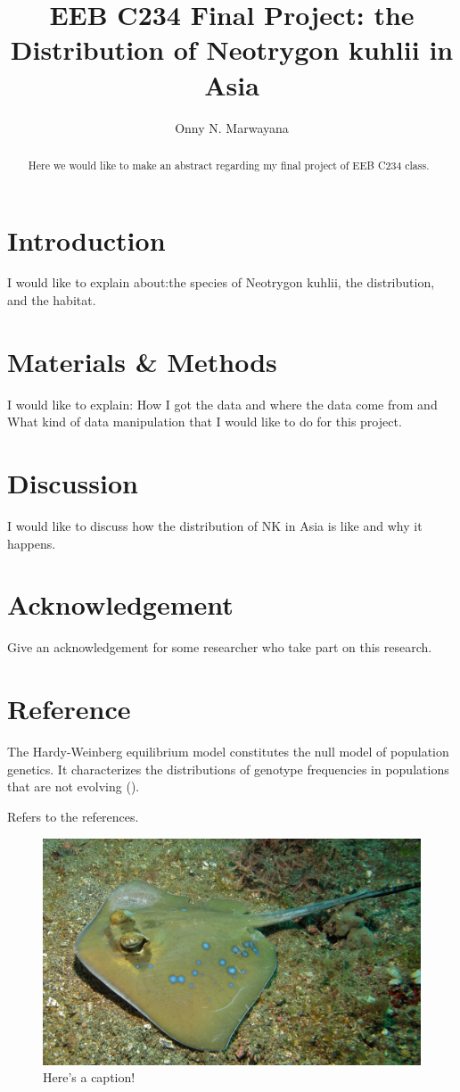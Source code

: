 \documentclass[12pt]{article}
\title{EEB C234 Final Project: the Distribution of Neotrygon kuhlii in Asia}
\author{Onny N. Marwayana}
\date{}
\begin{document}
\maketitle
\begin{abstract}
Here we would like to make an abstract regarding my final project of EEB C234 class.
\end{abstract}
\section{Introduction}
I would like to explain about:the species of Neotrygon kuhlii, the distribution, and the habitat.
\section{Materials \& Methods}
I would like to explain: How I got the data and where the data come from and What kind of data manipulation that I would like to do for this project.
\section{Discussion}
I would like to discuss how the distribution of NK in Asia is like and why it happens.
\section{Acknowledgement}
Give an acknowledgement for some researcher who take part on this research.
\section{Reference}
The Hardy-Weinberg equilibrium model constitutes the null model of population genetics. It characterizes the distributions of genotype frequencies in populations that are not evolving (\cite{Pavan-Kumar2013, Borsa2013, Florencia Cerutti-Pereyra2012}).

Refers to the references.

\begin{figure}
  \label{fig:pop}
\begin{center}
 \includegraphics[width=0.5\linewidth]{Blue-spotted_Stingray_(Neotrygon_kuhlii)_(8465011759).jpg}
\end{center}
\caption{Here's a caption!}

 \end{figure}
\end{document}

